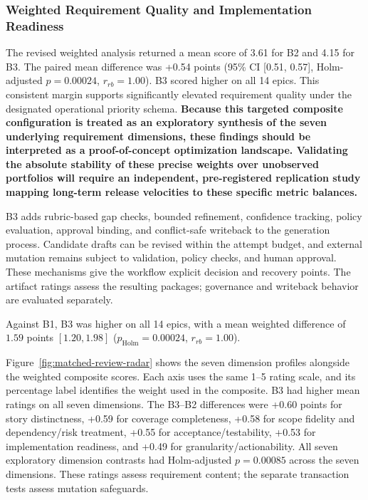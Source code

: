 \documentclass[pdflatex,sn-basic]{sn-jnl}
\begin{document}
\subsubsection{Weighted Requirement Quality and Implementation Readiness}
The revised weighted analysis returned a mean score of 3.61 for B2 and 4.15 for B3. The paired mean difference was +0.54 points (95\% CI [0.51, 0.57], Holm-adjusted $p=0.00024$, $r_{rb}=1.00$). B3 scored higher on all 14 epics. This consistent margin supports significantly elevated requirement quality under the designated operational priority schema. \textbf{Because this targeted composite configuration is treated as an exploratory synthesis of the seven underlying requirement dimensions, these findings should be interpreted as a proof-of-concept optimization landscape. Validating the absolute stability of these precise weights over unobserved portfolios will require an independent, pre-registered replication study mapping long-term release velocities to these specific metric balances.}

B3 adds rubric-based gap checks, bounded refinement, confidence tracking, policy evaluation, approval binding, and conflict-safe writeback to the generation process. Candidate drafts can be revised within the attempt budget, and external mutation remains subject to validation, policy checks, and human approval. These mechanisms give the workflow explicit decision and recovery points. The artifact ratings assess the resulting packages; governance and writeback behavior are evaluated separately.

Against B1, B3 was higher on all 14 epics, with a mean weighted difference of \(1.59\) points \([1.20, 1.98]\) (\(p_{\mathrm{Holm}}=0.00024\), \(r_{rb}=1.00\)).

Figure~\ref{fig:matched-review-radar} shows the seven dimension profiles alongside the weighted composite scores. Each axis uses the same 1--5 rating scale, and its percentage label identifies the weight used in the composite. B3 had higher mean ratings on all seven dimensions. The B3--B2 differences were +0.60 points for story distinctness, +0.59 for coverage completeness, +0.58 for scope fidelity and dependency/risk treatment, +0.55 for acceptance/testability, +0.53 for implementation readiness, and +0.49 for granularity/actionability. All seven exploratory dimension contrasts had Holm-adjusted $p=0.00085$ across the seven dimensions. These ratings assess requirement content; the separate transaction tests assess mutation safeguards.
\end{document}
